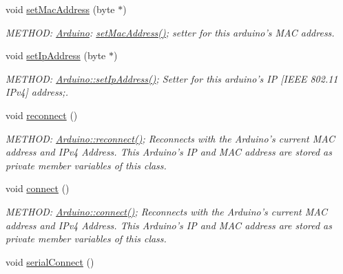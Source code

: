 \begin{DoxyCompactItemize}
void \hyperlink{classArduino_ab4692c5d510b6b5583e703ecd32bf778_ab4692c5d510b6b5583e703ecd32bf778}{setMacAddress} (byte $\ast$)
\begin{DoxyCompactList}\small\item\em METHOD: \hyperlink{classArduino}{Arduino}: \hyperlink{classArduino_ab4692c5d510b6b5583e703ecd32bf778_ab4692c5d510b6b5583e703ecd32bf778}{setMacAddress()}; setter for this arduino's MAC address. \item\end{DoxyCompactList}\item 
void \hyperlink{classArduino_a1c45a91da743dad62e50f8880ee6ec1f_a1c45a91da743dad62e50f8880ee6ec1f}{setIpAddress} (byte $\ast$)
\begin{DoxyCompactList}\small\item\em METHOD: \hyperlink{classArduino_a1c45a91da743dad62e50f8880ee6ec1f_a1c45a91da743dad62e50f8880ee6ec1f}{Arduino::setIpAddress()}; Setter for this arduino's IP \mbox{[}IEEE 802.11 IPv4\mbox{]} address;. \item\end{DoxyCompactList}\item 
void \hyperlink{classArduino_afecf95c6c107c1128de23d8b38602e88_afecf95c6c107c1128de23d8b38602e88}{reconnect} ()
\begin{DoxyCompactList}\small\item\em METHOD: \hyperlink{classArduino_afecf95c6c107c1128de23d8b38602e88_afecf95c6c107c1128de23d8b38602e88}{Arduino::reconnect()}; Reconnects with the Arduino's current MAC address and IPv4 Address. This Arduino's IP and MAC address are stored as private member variables of this class. \item\end{DoxyCompactList}\item 
void \hyperlink{classArduino_a56445661e05ebbe6fa7b30cb15f59e47_a56445661e05ebbe6fa7b30cb15f59e47}{connect} ()
\begin{DoxyCompactList}\small\item\em METHOD: \hyperlink{classArduino_a56445661e05ebbe6fa7b30cb15f59e47_a56445661e05ebbe6fa7b30cb15f59e47}{Arduino::connect()}; Reconnects with the Arduino's current MAC address and IPv4 Address. This Arduino's IP and MAC address are stored as private member variables of this class. \item\end{DoxyCompactList}\item 
void \hyperlink{classArduino_a34745ece538758a361a16beae91f8619_a34745ece538758a361a16beae91f8619}{serialConnect} ()

\end{DoxyCompactItemize}
